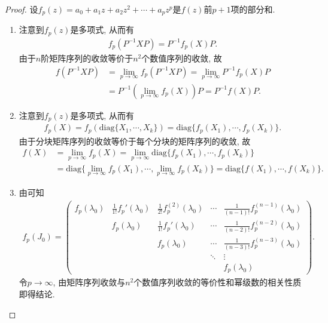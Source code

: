 \documentclass[../../main.tex]{subfiles}%
\begin{document}
\begin{proof}

设\(f_p(z)=a_0 + a_1z + a_2z^2 + \cdots + a_pz^p\)是\(f(z)\)前\(p + 1\)项的部分和.
\begin{enumerate}[(1)]
\item 注意到\(f_p(z)\)是多项式, 从而有
\begin{align*}
f_p(P^{-1}XP) = P^{-1}f_p(X)P.
\end{align*}
由于\(n\)阶矩阵序列的收敛等价于\(n^2\)个数值序列的收敛, 故
\begin{align*}
f(P^{-1}XP) &= \lim_{p \to \infty} f_p(P^{-1}XP) = \lim_{p \to \infty} P^{-1}f_p(X)P \\
&= P^{-1}(\lim_{p \to \infty} f_p(X))P = P^{-1}f(X)P.
\end{align*}

\item  注意到\(f_p(z)\)是多项式, 从而有
\begin{align*}
f_p(X) = f_p(\mathrm{diag}\{X_1,\cdots,X_k\}) = \mathrm{diag}\{f_p(X_1),\cdots,f_p(X_k)\}.
\end{align*}
由于分块矩阵序列的收敛等价于每个分块的矩阵序列的收敛, 故
\begin{align*}
f(X) &= \lim_{p \to \infty} f_p(X) = \lim_{p \to \infty} \mathrm{diag}\{f_p(X_1),\cdots,f_p(X_k)\} \\
&= \mathrm{diag}\{\lim_{p \to \infty} f_p(X_1),\cdots,\lim_{p \to \infty} f_p(X_k)\} = \mathrm{diag}\{f(X_1),\cdots,f(X_k)\}.
\end{align*}

\item  由可知
\begin{align*}
f_p(J_0)= \begin{pmatrix}
f_p(\lambda_0) & \frac{1}{1!}f_p'(\lambda_0) & \frac{1}{2!}f_p^{(2)}(\lambda_0) & \cdots & \frac{1}{(n - 1)!}f_p^{(n - 1)}(\lambda_0) \\
 & f_p(\lambda_0) & \frac{1}{1!}f_p'(\lambda_0) & \cdots & \frac{1}{(n - 2)!}f_p^{(n - 2)}(\lambda_0) \\
 & & f_p(\lambda_0) & \cdots & \frac{1}{(n - 3)!}f_p^{(n - 3)}(\lambda_0) \\
 & & & \ddots & \vdots \\
 & & & & f_p(\lambda_0)
\end{pmatrix}. 
\end{align*}
令\(p \to \infty\), 由矩阵序列收敛与\(n^2\)个数值序列收敛的等价性和幂级数的相关性质即得结论.
\end{enumerate}

\end{proof}
\end{document}
